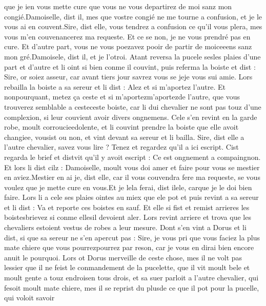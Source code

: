 \documentclass{article}
\begin{document}
\begin{pages}
      que je ien vous mette cure que vous ne vous departirez de moi sanz mon 
      congié.Damoiselle, dist il, mes que vostre congié ne me tourne a confusion, 
      et je le vous ai en couvent.Sire, dist elle, vous tendrez a confusion ce qu’il vous plera, mes vous m’en couvenancerez ma 
      requeste. Et ce se non, je ne vous prendré pas en cure. Et d’autre part, vous ne vous
      poezavez pooir de partir de 
      moiceeens sanz mon gré.Damoisele, dist il, et je l’otroi.
   Atant reversa la pucele 
   sesles plaies d’une part et d’autre et li oint 
   si bien conme il couvint, puis referma la boiste et dist :
   Sire, or soiez asseur, car avant tiers jour savrez vous se 
      jeje vous sui amie.
   Lors rebailla la boiste a sa sereur et li dist :
   Alez et si m’aportez l’autre. Et nonpourquant, metez ça ceste et si 
      m'aportezm'aportezde l’autre, 
      que vous trouverez semblable a 
      cesteceste boiste, car li dui chevalier ne sont pas touz 
   d’une complexion, si leur couvient avoir divers ongnemens.
   Cele s’en revint en la garde robe, moult corroucieedolente, et li couvint 
   prendre la boiste que elle avoit changiee, vousist ou non, et vint devant sa sereur 
   et li bailla.
   Sire, dist elle a l’autre chevalier, 
      savez vous lire ? Tenez et regardez qu’il a ici escript.
   Cist regarda le brief et distvit qu’il y avoit escript : 
   Ce est ongnement a compaingnon. Et lors li dist cilz :
   Damoiselle, moult vous doi amer et faire pour vous se mestier en aviez.Mestier en ai je, dist elle, car il vous couvendra fere ma requeste, 
      se vous voulez que je mette cure en vous.Et je lela ferai, dist 
      ilele, carque 
      je le doi bien faire.
   Lors li a cele ses plaies ointes au miex que ele pot et puis revint a sa sereur et li dist : 
   Va et reporte ces boistes en sauf.
   Et elle si fist et remist arrieres les boistesbrievez 
      si conme ellesil devoient aler. Lors revint arriere 
   et trova que les chevaliers estoient vestus de robes a leur mesure. Dont s’en vint a Dorus et li dist, 
   si que sa sereur ne s’en apercut pas :
   Sire, je vous pri que vous faciez la plus mate chiere que vous 
      pourrezpourrez par reson, 
   car je vous en dirai bien encore anuit le pourquoi.
   Lors ot Dorus merveille de ceste chose, mes il ne volt pas lessier que il ne feist le conmandement de 
   la pucelette, que il vit moult bele et moult gente 
   a touz endroisen tous drois, 
   et sa suer parloit a 
   l’autre chevalier, qui fesoit moult mate chiere, mes il se reprist 
   du plusde ce que il pot pour 
   la pucelle, qui voloit savoir 

\end{pages}
\end{document}
